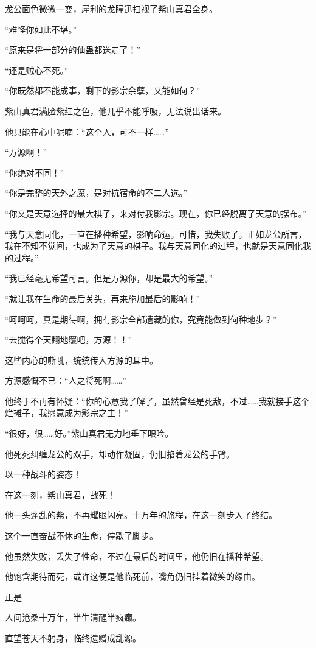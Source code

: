 \begin{this_body}
龙公面色微微一变，犀利的龙瞳迅扫视了紫山真君全身。

“难怪你如此不堪。”

“原来是将一部分的仙蛊都送走了！”

“还是贼心不死。”

“你既然都不能成事，剩下的影宗余孽，又能如何？”

紫山真君满脸紫红之色，他几乎不能呼吸，无法说出话来。

他只能在心中呢喃：“这个人，可不一样……”

“方源啊！”

“你绝对不同！”

“你是完整的天外之魔，是对抗宿命的不二人选。”

“你又是天意选择的最大棋子，来对付我影宗。现在，你已经脱离了天意的摆布。”

“我与天意同化，一直在播种希望，影响命运。可惜，我失败了。正如龙公所言，我在不知不觉间，也成为了天意的棋子。我与天意同化的过程，也就是天意同化我的过程。”

“我已经毫无希望可言。但是方源你，却是最大的希望。”

“就让我在生命的最后关头，再来施加最后的影响！”

“呵呵呵，真是期待啊，拥有影宗全部遗藏的你，究竟能做到何种地步？”

“去搅得个天翻地覆吧，方源！！”

这些内心的嘶吼，统统传入方源的耳中。

方源感慨不已：“人之将死啊……”

他终于不再有怀疑：“你的心意我了解了，虽然曾经是死敌，不过……我就接手这个烂摊子，我愿意成为影宗之主！”

“很好，很……好。”紫山真君无力地垂下眼睑。

他死死纠缠龙公的双手，却动作凝固，仍旧掐着龙公的手臂。

以一种战斗的姿态！

在这一刻，紫山真君，战死！

他一头蓬乱的紫，不再耀眼闪亮。十万年的旅程，在这一刻步入了终结。

这个一直奋战不休的生命，停歇了脚步。

他虽然失败，丢失了性命，不过在最后的时间里，他仍旧在播种希望。

他饱含期待而死，或许这便是他临死前，嘴角仍旧挂着微笑的缘由。

正是

人间沧桑十万年，半生清醒半疯癫。

直望苍天不躬身，临终遗赠成乱源。

\end{this_body}

